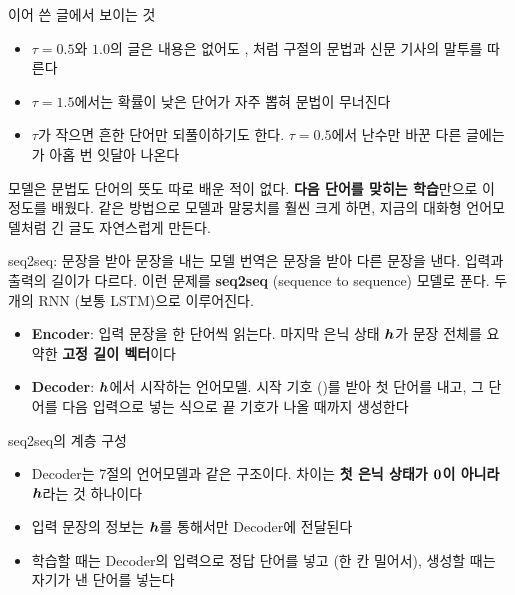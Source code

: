 \documentclass[aspectratio=169,11pt]{beamer}
\begin{document}
\begin{frame}{이어 쓴 글에서 보이는 것}
\begin{itemize}
\item $\tau=0.5$와 $1.0$의 글은 내용은 없어도 , 처럼
구절의 문법과 신문 기사의 말투를 따른다
\item $\tau=1.5$에서는 확률이 낮은 단어가 자주 뽑혀 문법이 무너진다
\item $\tau$가 작으면 흔한 단어만 되풀이하기도 한다.
$\tau=0.5$에서 난수만 바꾼 다른 글에는 가 아홉 번 잇달아 나온다
\end{itemize}
\vskip3mm
\begin{keybox}
모델은 문법도 단어의 뜻도 따로 배운 적이 없다. \textbf{다음 단어를 맞히는 학습}만으로 이 정도를 배웠다.
같은 방법으로 모델과 말뭉치를 훨씬 크게 하면, 지금의 대화형 언어모델처럼 긴 글도 자연스럽게 만든다.
\end{keybox}
\end{frame}

\begin{frame}{seq2seq: 문장을 받아 문장을 내는 모델}
번역은 문장을 받아 다른 문장을 낸다. 입력과 출력의 길이가 다르다.
이런 문제를 \textbf{seq2seq} (sequence to sequence) 모델로 푼다. 두 개의 RNN (보통 LSTM)으로 이루어진다.
\begin{itemize}
\item \textbf{Encoder}: 입력 문장을 한 단어씩 읽는다.
마지막 은닉 상태 $\bm{h}$가 문장 전체를 요약한 \textbf{고정 길이 벡터}이다
\item \textbf{Decoder}: $\bm{h}$에서 시작하는 언어모델. 시작 기호 ()를 받아 첫 단어를 내고,
그 단어를 다음 입력으로 넣는 식으로 끝 기호가 나올 때까지 생성한다
\end{itemize}
\end{frame}

\begin{frame}{seq2seq의 계층 구성}
\vskip1mm
\begin{itemize}
\item Decoder는 7절의 언어모델과 같은 구조이다.
차이는 \textbf{첫 은닉 상태가 $\bm{0}$이 아니라 $\bm{h}$}라는 것 하나이다
\item 입력 문장의 정보는 $\bm{h}$를 통해서만 Decoder에 전달된다
\item 학습할 때는 Decoder의 입력으로 정답 단어를 넣고 (한 칸 밀어서), 생성할 때는 자기가 낸 단어를 넣는다
\end{itemize}
\end{frame}
\end{document}
